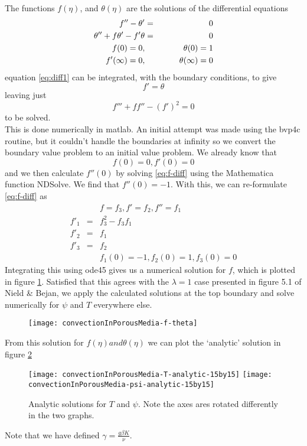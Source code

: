 \documentclass{article}
\begin{document}
The functions $f(\eta)$, and $\theta(\eta)$ are the solutions of the differential equations
\begin{eqnarray}
f'' - \theta' &=& 0 \label{eq:diff1} \\
\theta'' + f \theta' - f' \theta &=& 0 \label{eq:diff2}\\
f(0) = 0, &&\hspace{6ex} \theta(0) = 1 \\
f'(\infty) = 0, &&\hspace{5ex} \theta(\infty) = 0
\end{eqnarray}
equation \eqref{eq:diff1} can be integrated, with the boundary conditions, to give
\begin{equation}
f' = \theta
\end{equation}
leaving just 
\begin{equation}
f''' + ff'' - (f')^2 = 0 \label{eq:f-diff}
\end{equation}
to be solved. \\

This is done numerically in matlab. An initial attempt was made using the bvp4c routine, but it couldn't handle the boundaries at infinity so we convert the boundary value problem to an initial value problem. We already know that
\begin{equation}
f(0) = 0, f'(0) = 0 \label{eq:diff-bcs}
\end{equation}
and we then calculate $f''(0)$ by solving \eqref{eq:f-diff} using the Mathematica function NDSolve. We find that $f''(0) = -1$. With this, we can re-formulate \eqref{eq:f-diff} as
\begin{eqnarray}
&&f =f_3, f' = f_2, f'' = f_1 \\
f'_1 &=& f_3^2 - f_3 f_1 \\
f'_2 &=& f_1 \\
f'_3 &=& f_2 \\
&&f_1(0) = -1, f_2(0) = 1, f_3(0) = 0
\end{eqnarray}
Integrating this using ode45 gives us a numerical solution for $f$, which is plotted in figure \ref{fig:convectionInPorousMedia-f-theta}. Satisfied that this agrees with the $\lambda = 1$ case presented in figure 5.1 of Nield \& Bejan, we apply the calculated solutions at the top boundary and solve numerically for $\psi$ and $T$ everywhere else.
\begin{figure}[ht]
    \centering
    \texttt{[image: convectionInPorousMedia-f-theta]}
     \label{fig:convectionInPorousMedia-f-theta}
     \caption{}
 \end{figure}
 From this solution for $f(\eta) and \theta(\eta)$ we can plot the `analytic' solution in figure \ref{fig:convectionInPorousMedia-analytic-sol}
 \begin{figure}[ht]
    \centering
    \texttt{[image: convectionInPorousMedia-T-analytic-15by15]}
    \texttt{[image: convectionInPorousMedia-psi-analytic-15by15]}
     \label{fig:convectionInPorousMedia-analytic-sol}
     \caption{Analytic solutions for $T$ and $\psi$. Note the axes ares rotated differently in the two graphs.}
 \end{figure}
 Note that we have defined $\gamma = \frac{g \beta K}{\nu}$.
\end{document}
